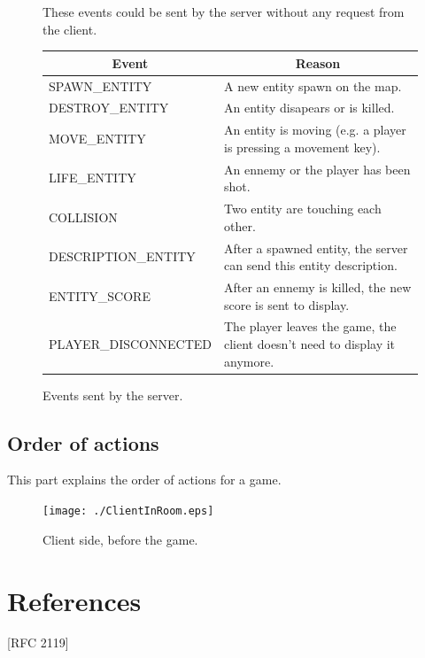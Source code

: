 \documentclass[a4 paper, 12pt]{report}
\begin{document}
\begin{figure}[!Hh]
  These events could be sent by the server without any request from the client.\\

  \centering
  \renewcommand{\arraystretch}{1.5}
  \begin{tabularx}{15cm}{|l|X|}
    \hline
    \multicolumn{1}{|c|}{\textbf{Event}} & \multicolumn{1}{c|}{\textbf{Reason}}\\
    \hline
    \hline
    SPAWN\_ENTITY & A new entity spawn on the map.\\
    \hline
    DESTROY\_ENTITY & An entity disapears or is killed.\\
    \hline
    MOVE\_ENTITY & An entity is moving (e.g. a player is pressing a movement key).\\
    \hline
    LIFE\_ENTITY & An ennemy or the player has been shot.\\
    \hline
    COLLISION & Two entity are touching each other.\\
    \hline
    DESCRIPTION\_ENTITY & After a spawned entity, the server can send this entity description.\\
    \hline
    ENTITY\_SCORE & After an ennemy is killed, the new score is sent to display.\\
    \hline
    PLAYER\_DISCONNECTED & The player leaves the game, the client doesn't need to display it anymore.\\
    \hline
  \end{tabularx}
  \caption{Events sent by the server.}
\end{figure}


\newpage

\section{Order of actions}
This part explains the order of actions for a game.

\begin{figure}[!Hh]
  \begin{center}
    \texttt{[image: ./ClientInRoom.eps]}
    \caption{Client side, before the game.}
  \end{center}
\end{figure}

\chapter{References}

[RFC 2119]
\newline
[RFC 2223]
\end{document}
